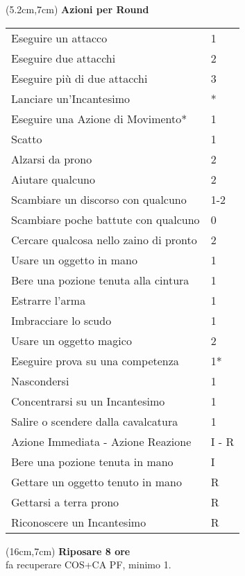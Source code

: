 \documentclass[a4paper,12 pt,openany]{book}
\begin{document}
\begin{textblock*}{10.5cm}(5.2cm,7cm) %
\textbf{Azioni per Round}

	\begin{tabular}{ll}
Eseguire un attacco  					& 1\\
Eseguire due attacchi					& 2\\
Eseguire più di due attacchi			& 3\\
Lanciare un'Incantesimo					& *\\
Eseguire una Azione di Movimento*		& 1\\
Scatto               					& 1\\
Alzarsi da prono						& 2\\
Aiutare qualcuno						& 2\\
Scambiare un discorso con qualcuno		& 1-2\\
Scambiare poche battute con qualcuno	& 0\\
Cercare qualcosa nello zaino di pronto	& 2\\
Usare un oggetto in mano      			& 1\\
Bere una pozione tenuta alla cintura	& 1\\
Estrarre l'arma        					& 1\\
Imbracciare lo scudo					& 1\\
Usare un oggetto magico 				& 2\\
Eseguire prova su una competenza		& 1*\\
Nascondersi								& 1\\
Concentrarsi su un Incantesimo     		& 1\\
Salire o scendere dalla cavalcatura		& 1\\
Azione Immediata - Azione Reazione		& I - R\\
Bere una pozione tenuta in mano			& I\\
Gettare un oggetto tenuto in mano   	& R\\
Gettarsi a terra prono					& R\\
Riconoscere un Incantesimo				& R\\
	\end{tabular}

	\end{textblock*}

	\begin{textblock*}{4cm}(16cm,7cm) %
{\footnotesize\textbf{Riposare 8 ore} \\fa recuperare COS+CA PF, minimo 1.}
		\end{textblock*}
\end{document}

